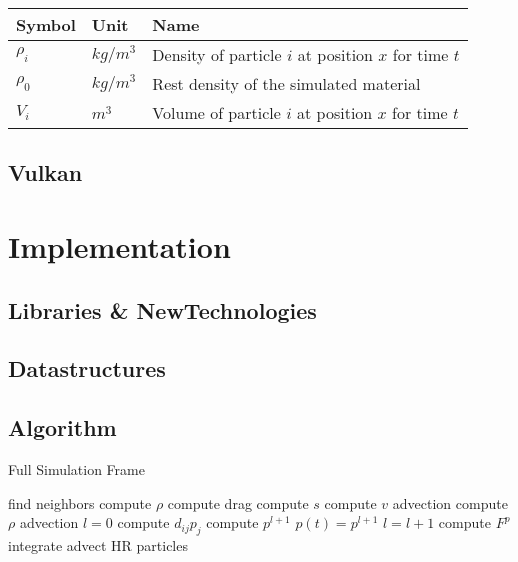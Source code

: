\documentclass[intern]{cgMA}
\begin{document}
    \begin{center} 
        \begin{tabular}{|l|l|l|}
        \hline
        Symbol & Unit & Name \\
        \hline
        $\rho_i$ & $kg/m^3$ & Density of particle $i$ at position $x$ for time $t$ \\
        $\rho_0$ & $kg/m^3$ & Rest density of the simulated material \\
        $V_i$ & $m^3$ & Volume of particle $i$ at position $x$ for time $t$ \\
        \hline
        
        \end{tabular}
    \end{center}
    
    \subsection{Vulkan}
    
    \section{Implementation}
    
    \subsection{Libraries \& NewTechnologies}
    
    \subsection{Datastructures}
    
    \subsection{Algorithm}
    \begin{algorithm}
        \caption{Full Simulation Frame}
        \begin{algorithmic}[1]
        \State find neighbors 
        \State compute $\rho$
        \State compute drag 
        \State compute $s$ 
        \State compute $v$ advection 
        \State compute $\rho$ advection 
        \State $l = 0$
            \State compute $d_{ij}p_{j}$
            \State compute $p^{l+1}$
            \State $p(t) = p^{l+1}$
            \State $l = l+1$
        \EndWhile
        \State compute $F^p$ 
        \State integrate 
        \State advect HR particles 
        \end{algorithmic}
    \end{algorithm}
    
\end{document}
